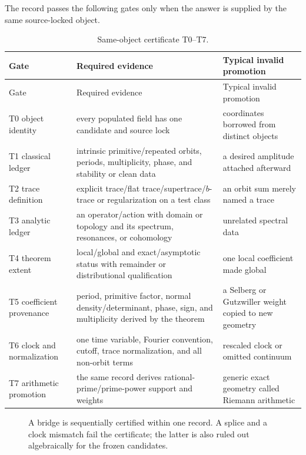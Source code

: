 \documentclass[11pt]{article}
\theoremstyle{definition}
\theoremstyle{remark}
\begin{document}
The record passes the following gates only when the answer is supplied by the
same source-locked object.

\begin{longtable}{P{0.17\textwidth}P{0.37\textwidth}P{0.36\textwidth}}
\caption{Same-object certificate T0--T7.}\label{tab:gates}\\
\toprule
Gate & Required evidence & Typical invalid promotion\\
\midrule
\endfirsthead
\toprule
Gate & Required evidence & Typical invalid promotion\\
\midrule
\endhead
T0 object identity & every populated field has one candidate and source lock & coordinates borrowed from distinct objects\\
T1 classical ledger & intrinsic primitive/repeated orbits, periods, multiplicity, phase, and stability or clean data & a desired amplitude attached afterward\\
T2 trace definition & explicit trace/flat trace/supertrace/\(b\)-trace or regularization on a test class & an orbit sum merely named a trace\\
T3 analytic ledger & an operator/action with domain or topology and its spectrum, resonances, or cohomology & unrelated spectral data\\
T4 theorem extent & local/global and exact/asymptotic status with remainder or distributional qualification & one local coefficient made global\\
T5 coefficient provenance & period, primitive factor, normal density/determinant, phase, sign, and multiplicity derived by the theorem & a Selberg or Gutzwiller weight copied to new geometry\\
T6 clock and normalization & one time variable, Fourier convention, cutoff, trace normalization, and all non-orbit terms & rescaled clock or omitted continuum\\
T7 arithmetic promotion & the same record derives rational-prime/prime-power support and weights & generic exact geometry called Riemann arithmetic\\
\bottomrule
\end{longtable}

\begin{figure}[ht]
\centering

\caption{A bridge is sequentially certified within one record.  A splice and
a clock mismatch fail the certificate; the latter is also ruled out
algebraically for the frozen candidates.}
\label{fig:certificate}
\end{figure}
\end{document}
